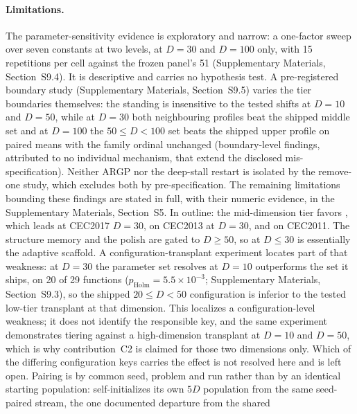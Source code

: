 \paragraph{Limitations.}
The parameter-sensitivity evidence is exploratory and narrow: a one-factor
sweep over seven constants at two levels, at $D = 30$ and $D = 100$ only, with
15 repetitions per cell against the frozen panel's 51 (Supplementary Materials,
Section~S9.4). It is descriptive and carries no hypothesis test. A
pre-registered boundary study (Supplementary Materials,
Section~S9.5) varies the tier boundaries themselves: the standing is
insensitive to the tested shifts at $D = 10$ and $D = 50$, while at $D = 30$
both neighbouring profiles beat the shipped middle set and at $D = 100$ the
$50 \leq D < 100$ set beats the shipped upper profile on paired means with
the family ordinal unchanged (boundary-level findings, attributed to no
individual mechanism, that extend the disclosed mis-specification).
Neither ARGP nor the deep-stall restart is isolated by the remove-one study,
which excludes both by pre-specification.
The remaining limitations bounding these findings are stated in full, with
their numeric evidence, in the Supplementary Materials, Section~S5. In
outline: the
mid-dimension tier favors \egsk{}, which leads at CEC2017 $D = 30$, on CEC2013
at $D = 30$, and on CEC2011. The structure memory and the polish are gated to
$D \geq 50$, so at $D \leq 30$ \dtgsk{} is essentially the adaptive scaffold.
A configuration-transplant experiment locates part of that
weakness: at $D = 30$ the parameter set \dtgsk{} resolves at $D = 10$
outperforms the set it ships, on 20 of 29 functions
($p_{\mathrm{Holm}} = 5.5\times10^{-3}$; Supplementary Materials,
Section~S9.3), so the shipped $20 \leq D < 50$ configuration is inferior to
the tested low-tier transplant at that dimension. This localizes a
configuration-level weakness; it does not identify the responsible key, and
the same experiment demonstrates tiering against a high-dimension transplant
at $D = 10$ and $D = 50$, which is why contribution~C2 is claimed for those
two dimensions only. Which of the differing configuration keys carries
the effect is not resolved here and is left open.
Pairing is by common seed, problem and run rather than by an identical
starting population: \dtgsk{} self-initializes its own $5D$ population from
the same seed-paired stream, the one documented departure from the shared

